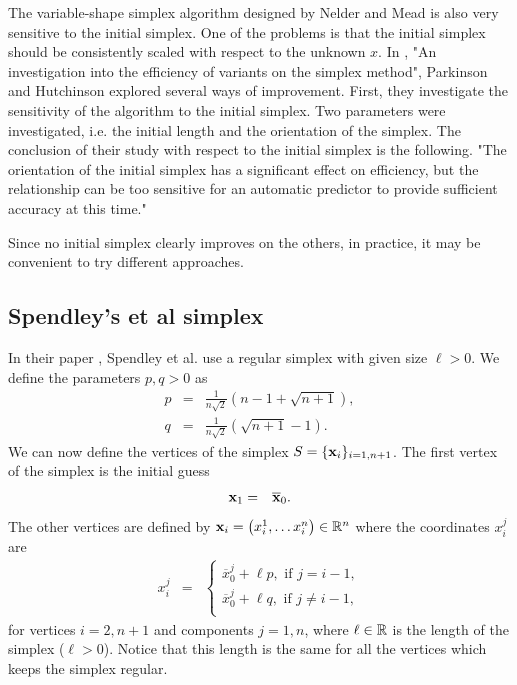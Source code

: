 The variable-shape simplex algorithm designed by Nelder and Mead is also very
sensitive to the initial simplex.
One of the problems is that the initial simplex should be consistently scaled 
with respect to the unknown $x$.
In \cite{parkinson1972}, "An investigation into the efficiency of variants on the simplex method", 
Parkinson and Hutchinson explored 
several ways of improvement. First, they investigate the sensitivity
of the algorithm to the initial simplex. Two parameters were investigated,
i.e. the initial length and the orientation of the simplex. 
The conclusion of their study with respect to the initial simplex is 
the following. "The orientation of the initial simplex has a significant effect 
on efficiency, but the relationship can be too sensitive for an automatic 
predictor to provide sufficient accuracy at this time."

Since no initial simplex clearly improves on the others, in practice, 
it may be convenient to try different approaches.

\subsection{Spendley's et al simplex}

In their paper \cite{Spendley1962}, Spendley et al. use a regular 
simplex with given size $\ell>0$. We define the parameters $p,q>0$ as 
\begin{eqnarray}
p &=& \frac{1}{n\sqrt{2}} \left(n-1 + \sqrt{n+1}\right), \\
q &=& \frac{1}{n\sqrt{2}} \left(\sqrt{n+1} - 1\right).
\end{eqnarray}
We can now define the vertices of the simplex $S=\{\mathbf{x}_i\}_{i=1,n+1}$.
The first vertex of the simplex is the initial guess 
\begin{eqnarray}
\mathbf{x}_1 &=& \overline{\mathbf{x}}_0.
\end{eqnarray}
The other vertices are defined by $\mathbf{x}_i = \left( x_i^1, \ldots x_i^n\right)\in\mathbb{R}^n$
where the coordinates $x_i^j$ are 
\begin{eqnarray}
x_i^j &=& 
\left\{
\begin{array}{l}
\overline{x}_0^j + \ell p, \textrm{ if } j=i-1,\\
\overline{x}_0^j + \ell q, \textrm{ if } j\neq i-1,\\
\end{array}
\right.
\end{eqnarray}
for vertices $i=2,n+1$ and components $j=1,n$, 
where $\ell \in\mathbb{R}$ is the length of the simplex ($\ell>0$). Notice that this 
length is the same for all the vertices which keeps the simplex regular.

